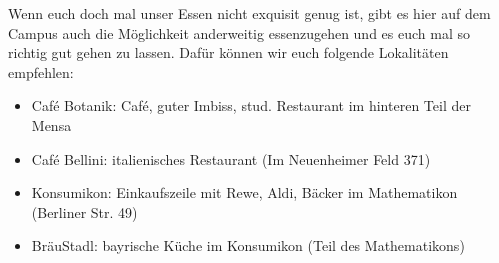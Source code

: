   Wenn euch doch mal unser Essen nicht exquisit genug ist, gibt es hier auf dem Campus auch die Möglichkeit
  anderweitig essenzugehen und es euch mal so richtig gut gehen zu lassen. Dafür können wir euch
  folgende Lokalitäten empfehlen:
  \begin{itemize}
  \item Café Botanik: Café, guter Imbiss, stud. Restaurant im hinteren Teil der Mensa
  \item Café Bellini: italienisches Restaurant (Im Neuenheimer Feld 371)
  \item Konsumikon: Einkaufszeile mit Rewe, Aldi, Bäcker im Mathematikon (Berliner Str. 49)
  \item BräuStadl: bayrische Küche im Konsumikon (Teil des Mathematikons)
  \end{itemize}
